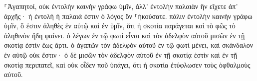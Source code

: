 \documentclass{openreader}
\begin{document}
⸀Ἀγαπητοί, οὐκ ἐντολὴν καινὴν γράφω ὑμῖν, ἀλλ’ ἐντολὴν παλαιὰν ἣν εἴχετε ἀπ’ ἀρχῆς· ἡ ἐντολὴ ἡ παλαιά ἐστιν ὁ λόγος ὃν ⸀ἠκούσατε. πάλιν ἐντολὴν καινὴν γράφω ὑμῖν, ὅ ἐστιν ἀληθὲς ἐν αὐτῷ καὶ ἐν ὑμῖν, ὅτι ἡ σκοτία παράγεται καὶ τὸ φῶς τὸ ἀληθινὸν ἤδη φαίνει. ὁ λέγων ἐν τῷ φωτὶ εἶναι καὶ τὸν ἀδελφὸν αὐτοῦ μισῶν ἐν τῇ σκοτίᾳ ἐστὶν ἕως ἄρτι. ὁ ἀγαπῶν τὸν ἀδελφὸν αὐτοῦ ἐν τῷ φωτὶ μένει, καὶ σκάνδαλον ἐν αὐτῷ οὐκ ἔστιν· ὁ δὲ μισῶν τὸν ἀδελφὸν αὐτοῦ ἐν τῇ σκοτίᾳ ἐστὶν καὶ ἐν τῇ σκοτίᾳ περιπατεῖ, καὶ οὐκ οἶδεν ποῦ ὑπάγει, ὅτι ἡ σκοτία ἐτύφλωσεν τοὺς ὀφθαλμοὺς αὐτοῦ. 
\end{document}
